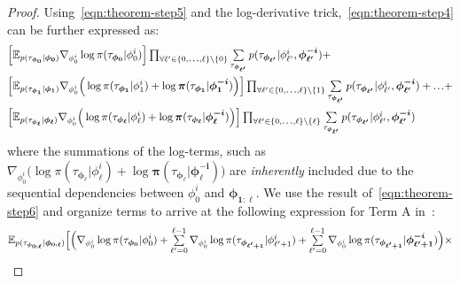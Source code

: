 \begin{proof}
Using~\cref{eqn:theorem-step5} and the log-derivative trick,~\cref{eqn:theorem-step4} can be further expressed as:
\begin{align}\label{eqn:theorem-step6}
\begin{split}
&\Big[\mathbb{E}_{p(\tau_{\bm{\phi}_{\bm{0}}}|\bm{\phi}_{\bm{0}})}\nabla_{\phi^{i}_{0}}\log\pi(\tau_{\bm{\phi}_{\bm{0}}}|\phi^{i}_{0})\Big]\textstyle\prod\nolimits_{\forall\ell'\in\{0,\sdots,\ell\}\setminus \{0\}}\smallsum_{\tau_{\bm{\phi}_{\bm{\ell'}}}}p(\tau_{\bm{\phi}_{\bm{\ell'}}}|\phi^{i}_{\ell'},\bm{\phi}^{\bm{-i}}_{\bm{\ell'}})+\\
&\Big[\mathbb{E}_{p(\tau_{\bm{\phi}_{\bm{1}}}|\bm{\phi}_{\bm{1}})}\nabla_{\phi^{i}_{0}}\Big(\log\pi(\tau_{\bm{\phi}_{\bm{1}}}|\phi^{i}_{1})+\log\bm{\pi}(\tau_{\bm{\phi}_{\bm{1}}}|\bm{\phi}^{\bm{-i}}_{\bm{1}})\Big)\Big]\textstyle\prod\nolimits_{\forall\ell'\in\{0,\sdots,\ell\}\setminus \{1\}}\smallsum_{\tau_{\bm{\phi}_{\bm{\ell'}}}}p(\tau_{\bm{\phi}_{\bm{\ell'}}}|\phi^{i}_{\ell'},\bm{\phi}^{\bm{-i}}_{\bm{\ell'}})+\sdots+\\
&\Big[\mathbb{E}_{p(\tau_{\bm{\phi}_{\bm{\ell}}}|\bm{\phi}_{\bm{\ell}})}\nabla_{\phi^{i}_{0}}\Big(\log\pi(\tau_{\bm{\phi}_{\bm{\ell}}}|\phi^{i}_{\ell})+\log\bm{\pi}(\tau_{\bm{\phi}_{\bm{\ell}}}|\bm{\phi}^{\bm{-i}}_{\bm{\ell}})\Big)\Big]\textstyle\prod\nolimits_{\forall\ell'\in\{0,\sdots,\ell\}\setminus \{\ell\}}\smallsum_{\tau_{\bm{\phi}_{\bm{\ell'}}}}p(\tau_{\bm{\phi}_{\bm{\ell'}}}|\phi^{i}_{\ell'},\bm{\phi}^{\bm{-i}}_{\bm{\ell'}})
\end{split}
\end{align}
where the summations of the log-terms, such as $\nabla_{\phi^{i}_{0}}\!\Big(\!\log\pi(\tau_{\bm{\phi}_{\bm{\ell}}}|\phi^{i}_{\ell})\!+\!\log\bm{\pi}(\tau_{\bm{\phi}_{\bm{\ell}}}|\bm{\phi}^{\bm{-i}}_{\bm{\ell}})\!\Big)$ are \textit{inherently} included due to the sequential dependencies between $\phi^{i}_{0}$ and $\bm{\phi}_{\bm{1:\ell}}$. We use the result of~\cref{eqn:theorem-step6} and organize terms to arrive at the following expression for Term A in~:
\begin{align}\label{eqn:theorem-step7}
\begin{split}
\mathbb{E}_{p(\tau_{\bm{\phi}_{\bm{0:\ell}}}|\bm{\phi}_{\bm{0:\ell}})}\Big[&\Big(\nabla_{\phi^{i}_{0}}\log\pi(\tau_{\bm{\phi}_{\bm{0}}}|\phi^{i}_{0})+\smallsum_{\ell'=0}^{\ell-1}\nabla_{\phi^{i}_{0}}\log\pi(\tau_{\bm{\phi_{\ell'+1}}}|\phi^{i}_{\ell'+1})+\smallsum_{\ell'=0}^{\ell-1}\nabla_{\phi^{i}_{0}}\log\pi(\tau_{\bm{\phi_{\ell'+1}}}|\bm{\phi}^{\bm{-i}}_{\bm{\ell'+1}})\Big)\times\\

\end{split}
\end{align}
\end{proof}
